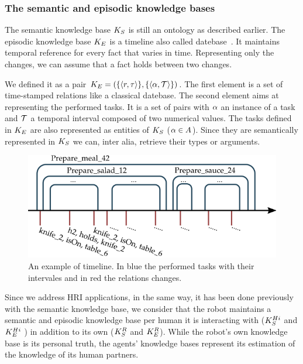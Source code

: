 \subsubsection{The semantic and episodic knowledge bases}

The semantic knowledge base $K_S$ is still an ontology as described earlier. The episodic knowledge base $K_E$ is a timeline also called datebase~\cite{allen_1983_maintaining}. It maintains temporal reference for every fact that varies in time. Representing only the changes, we can assume that a fact holds between two changes.

We defined it as a pair $K_E = ( \{ \langle r, \tau \rangle \}, \{ \langle \alpha, \mathcal{T} \rangle \} )$. The first element is a set of time-stamped relations like a classical datebase. The second element aims at representing the performed tasks. It is a set of pairs with $\alpha$ an instance of a task and $\mathcal{T}$ a temporal interval composed of two numerical values. The tasks defined in $K_E$ are also represented as entities of $K_S$ ($\alpha \in A$). Since they are semantically represented in $K_S$ we can, inter alia, retrieve their types or arguments.

\begin{figure}[h!]
\centering
\includegraphics[scale=0.55]{figures/chapter6/ke.png}
\caption{\label{fig:chap6_ke} An example of timeline. In blue the performed tasks with their intervales and in red the relations changes.}
\end{figure}

Since we address HRI applications, in the same way, it has been done previously with the semantic knowledge base, we consider that the robot maintains a semantic and episodic knowledge base per human it is interacting with ($K_S^{Hi}$ and $K_E^{Hi}$ ) in addition to its own ($K_S^{R}$ and $K_E^{R}$). While the robot's own knowledge base is its personal truth, the agents' knowledge bases represent its estimation of the knowledge of its human partners.


